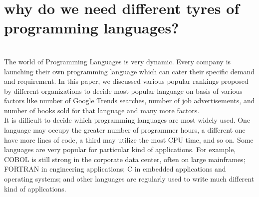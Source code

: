 \documentclass[a4paper, 12pt]{report}
\begin{document}
\section{\large{why do we need different tyres of programming languages?}}\\
 \large{The world of Programming Languages is very dynamic. Every company is launching their own programming language which can 
cater their specific demand and requirement. In this paper, we discussed various popular rankings proposed by different organizations to decide 
most popular language on basis of various factors like number of Google Trends searches, number of job advertisements, and number of books 
sold for that language and many more factors. 
\\
  It is difficult to decide which programming languages are most widely used. One language may occupy the greater number of 
programmer hours, a different one have more lines of code, a third may utilize the most CPU time, and so on. Some languages are 
very popular for particular kind of applications. For example, COBOL is still strong in the corporate data center, often on large 
mainframes; FORTRAN in engineering applications; C in embedded applications and operating systems; and other languages are 
regularly used to write much different kind of applications.
}
\\
\newpage
\\
\\
\end{document}
